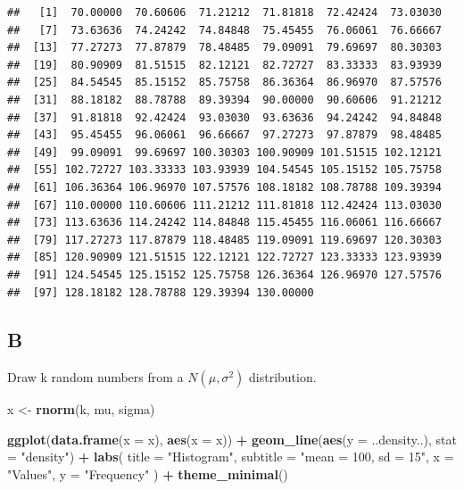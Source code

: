 \documentclass[
]{article}
\newenvironment{Shaded}{\begin{snugshade}}{\end{snugshade}}
\newcommand{\DataTypeTok}[1]{\textcolor[rgb]{0.13,0.29,0.53}{#1}}
\newcommand{\KeywordTok}[1]{\textcolor[rgb]{0.13,0.29,0.53}{\textbf{#1}}}
\newcommand{\NormalTok}[1]{#1}
\newcommand{\OperatorTok}[1]{\textcolor[rgb]{0.81,0.36,0.00}{\textbf{#1}}}
\newcommand{\StringTok}[1]{\textcolor[rgb]{0.31,0.60,0.02}{#1}}
\begin{document}
\begin{verbatim}
##   [1]  70.00000  70.60606  71.21212  71.81818  72.42424  73.03030
##   [7]  73.63636  74.24242  74.84848  75.45455  76.06061  76.66667
##  [13]  77.27273  77.87879  78.48485  79.09091  79.69697  80.30303
##  [19]  80.90909  81.51515  82.12121  82.72727  83.33333  83.93939
##  [25]  84.54545  85.15152  85.75758  86.36364  86.96970  87.57576
##  [31]  88.18182  88.78788  89.39394  90.00000  90.60606  91.21212
##  [37]  91.81818  92.42424  93.03030  93.63636  94.24242  94.84848
##  [43]  95.45455  96.06061  96.66667  97.27273  97.87879  98.48485
##  [49]  99.09091  99.69697 100.30303 100.90909 101.51515 102.12121
##  [55] 102.72727 103.33333 103.93939 104.54545 105.15152 105.75758
##  [61] 106.36364 106.96970 107.57576 108.18182 108.78788 109.39394
##  [67] 110.00000 110.60606 111.21212 111.81818 112.42424 113.03030
##  [73] 113.63636 114.24242 114.84848 115.45455 116.06061 116.66667
##  [79] 117.27273 117.87879 118.48485 119.09091 119.69697 120.30303
##  [85] 120.90909 121.51515 122.12121 122.72727 123.33333 123.93939
##  [91] 124.54545 125.15152 125.75758 126.36364 126.96970 127.57576
##  [97] 128.18182 128.78788 129.39394 130.00000
\end{verbatim}

\hypertarget{b-2}{%
\subsection{B}\label{b-2}}

Draw k random numbers from a \(N(\mu, \sigma^2)\) distribution.

\begin{Shaded}
\begin{Highlighting}[]
\NormalTok{x \textless{}{-}}\StringTok{ }\KeywordTok{rnorm}\NormalTok{(k, mu, sigma)}

\KeywordTok{ggplot}\NormalTok{(}\KeywordTok{data.frame}\NormalTok{(}\DataTypeTok{x =}\NormalTok{ x), }\KeywordTok{aes}\NormalTok{(}\DataTypeTok{x =}\NormalTok{ x)) }\OperatorTok{+}
\StringTok{  }\KeywordTok{geom\_line}\NormalTok{(}\KeywordTok{aes}\NormalTok{(}\DataTypeTok{y =}\NormalTok{ ..density..), }\DataTypeTok{stat =} \StringTok{"density"}\NormalTok{) }\OperatorTok{+}
\StringTok{  }\KeywordTok{labs}\NormalTok{(}
    \DataTypeTok{title =} \StringTok{"Histogram"}\NormalTok{,}
    \DataTypeTok{subtitle =} \StringTok{"mean = 100, sd = 15"}\NormalTok{,}
    \DataTypeTok{x =} \StringTok{"Values"}\NormalTok{,}
    \DataTypeTok{y =} \StringTok{"Frequency"}
\NormalTok{  ) }\OperatorTok{+}
\StringTok{  }\KeywordTok{theme\_minimal}\NormalTok{()}
\end{Highlighting}
\end{Shaded}
\end{document}

